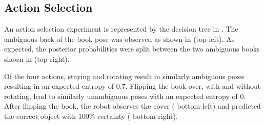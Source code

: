\vspace{-1ex}
    \subsection{Action Selection}
	An action selection experiment is represented by the decision tree in .    
	The ambiguous back of the book pose was observed as shown in  (top-left). As expected, the posterior probabilities were split between the two ambiguous books shown in  (top-right).    

 Of the four actions, staying and rotating result in similarly ambiguous poses resulting in an expected entropy of $0.7$. Flipping the book over, with and without rotating, lead to similarly unambiguous poses with an expected entropy of $0$. After flipping the book, the robot observes the cover ( bottom-left) and predicted the correct object with 100\% certainty ( bottom-right).

    
    

        

